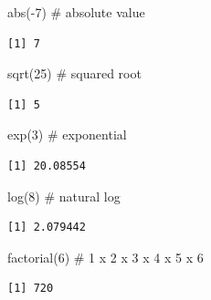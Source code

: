 \documentclass[
  letterpaper,
  DIV=11,
  numbers=noendperiod]{scrreprt}
\newenvironment{Shaded}{\begin{snugshade}}{\end{snugshade}}
\newcommand{\CommentTok}[1]{\textcolor[rgb]{0.37,0.37,0.37}{#1}}
\newcommand{\DecValTok}[1]{\textcolor[rgb]{0.68,0.00,0.00}{#1}}
\newcommand{\FunctionTok}[1]{\textcolor[rgb]{0.28,0.35,0.67}{#1}}
\newcommand{\NormalTok}[1]{\textcolor[rgb]{0.00,0.23,0.31}{#1}}
\newcommand{\SpecialCharTok}[1]{\textcolor[rgb]{0.37,0.37,0.37}{#1}}
\begin{document}
\begin{tcolorbox}[enhanced jigsaw, colbacktitle=quarto-callout-tip-color!10!white, opacitybacktitle=0.6, breakable, left=2mm, leftrule=.75mm, toprule=.15mm, toptitle=1mm, bottomtitle=1mm, colframe=quarto-callout-tip-color-frame, opacityback=0, coltitle=black, arc=.35mm, titlerule=0mm, colback=white, bottomrule=.15mm, title=\textcolor{quarto-callout-tip-color}{\faLightbulb}\hspace{0.5em}{Answer}, rightrule=.15mm]

\begin{Shaded}
\begin{Highlighting}[]
\FunctionTok{abs}\NormalTok{(}\SpecialCharTok{{-}}\DecValTok{7}\NormalTok{)         }\CommentTok{\# absolute value}
\end{Highlighting}
\end{Shaded}

\begin{verbatim}
[1] 7
\end{verbatim}

\begin{Shaded}
\begin{Highlighting}[]
\FunctionTok{sqrt}\NormalTok{(}\DecValTok{25}\NormalTok{)        }\CommentTok{\# squared root}
\end{Highlighting}
\end{Shaded}

\begin{verbatim}
[1] 5
\end{verbatim}

\begin{Shaded}
\begin{Highlighting}[]
\FunctionTok{exp}\NormalTok{(}\DecValTok{3}\NormalTok{)          }\CommentTok{\# exponential}
\end{Highlighting}
\end{Shaded}

\begin{verbatim}
[1] 20.08554
\end{verbatim}

\begin{Shaded}
\begin{Highlighting}[]
\FunctionTok{log}\NormalTok{(}\DecValTok{8}\NormalTok{)          }\CommentTok{\# natural log}
\end{Highlighting}
\end{Shaded}

\begin{verbatim}
[1] 2.079442
\end{verbatim}

\begin{Shaded}
\begin{Highlighting}[]
\FunctionTok{factorial}\NormalTok{(}\DecValTok{6}\NormalTok{)    }\CommentTok{\# 1 x 2 x 3 x 4 x 5 x 6}
\end{Highlighting}
\end{Shaded}

\begin{verbatim}
[1] 720
\end{verbatim}

\end{tcolorbox}
\end{document}
